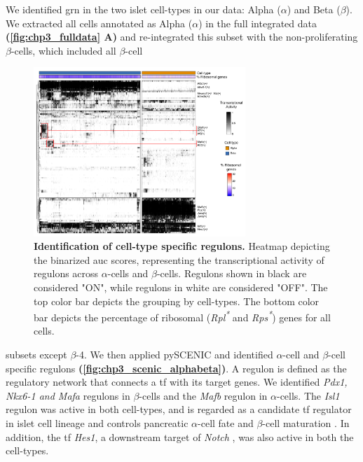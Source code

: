 \par We identified \gls{grn} in the two islet cell-types in our data: Alpha ($\alpha$) and Beta ($\beta$). We extracted all cells annotated as Alpha ($\alpha$) in the full integrated data \textbf{(\autoref{fig:chp3_fulldata} A)} and re-integrated this subset with the non-proliferating $\beta$-cells, which included all $\beta$-cell

\begin{figure}
\vspace{-10pt}
\includegraphics[width=8cm]{Chapter5/Fig/F3-11-01.png}
\caption[Identification of cell-type specific regulons]{\textbf{Identification of cell-type specific regulons.} Heatmap depicting the binarized \gls{auc} scores, representing the transcriptional activity of regulons across $\alpha$-cells and $\beta$-cells. Regulons shown in black are considered "ON", while regulons in white are considered "OFF". The top color bar depicts the grouping by cell-types. The bottom color bar depicts the percentage of ribosomal (\textit{Rpl\textsuperscript{*}} and \textit{Rps\textsuperscript{*}}) genes for all cells.}
\vspace{-20pt}
\label{fig:chp3_scenic_alphabeta}
\end{figure}

subsets except $\beta$-4. We then applied pySCENIC and identified $\alpha$-cell and $\beta$-cell specific regulons \textbf{(\autoref{fig:chp3_scenic_alphabeta})}. A regulon is defined as the regulatory network that connects a \gls{tf} with its target genes. We identified \textit{Pdx1, Nkx6-1 and Mafa} regulons in $\beta$-cells and the \textit{Mafb} regulon in $\alpha$-cells. The \textit{Isl1} regulon was active in both cell-types, and is regarded as a candidate \gls{tf} regulator in islet cell lineage \textbf{\cite{juhl_mouse_2008}} and controls pancreatic $\alpha$-cell fate and $\beta$-cell maturation \textbf{\cite{bohuslavova_isl1_2023}}. In addition, the \gls{tf} \textit{Hes1}, a downstream target of \textit{Notch} \textbf{\cite{hashemitabar_redefining_2019}}, was also active in both the cell-types.\\

